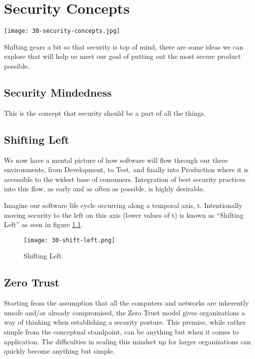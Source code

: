 \chapter{Security Concepts}

\texttt{[image: 30-security-concepts.jpg]}

\justifying
Shifting gears a bit so that security is top of mind, there are some ideas we can explore that will help ue meet our goal of
putting out the most secure product possible.

\section{Security Mindedness}

\justifying
This is the concept that security should be a part of all the things.

\section{Shifting Left}

\justifying
We now have a mental picture of how software will flow through our three environments, from
Development, to Test, and finally into Production where it is accessible to the widest
base of consumers. Integration of best security practices into this flow, as early and as often
as possible, is highly desirable.

\justifying
Imagine our software life cycle occurring along a temporal axis, t. Intentionally moving security to the
left on this axis (lower values of t) is known as ``Shifting Left'' as seen
in figure \ref{shift}.

\begin{figure}
	\centering
	\texttt{[image: 30-shift-left.png]}
	\caption{Shifting Left}
	\label{shift}
\end{figure}

\section{Zero Trust}

\justifying
Starting from the assumption that all the computers and networks are inherently unsafe and/or already compromised, the
Zero Trust model gives organizations a way of thinking when establishing a security posture.\cite{zerotrust} This premise,
while rather simple from the conceptual standpoint, can be anything but when it comes to application. The difficulties in
scaling this mindset up for larger organizations can quickly become anything but simple.

